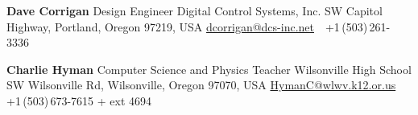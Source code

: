 \documentclass[letterpaper,MMMyyyy,nonstop]{simpleresumecv}
\newcommand{\CVNote}{}
\begin{document}
\begin{body}
\BigGap
\BulletItem
\textbf{Dave Corrigan}
\newline
Design Engineer
\newline
Digital Control Systems, Inc.
 SW Capitol Highway, 
Portland, Oregon 97219, USA
\newline
\href{mailto:dcorrigan@dcs-inc.net}
{dcorrigan@dcs-inc.net}
\,\SubBulletSymbol\,
+1\,(503)\,261-3336

\BigGap
\BulletItem
\textbf{Charlie Hyman}
\newline
Computer Science and Physics Teacher 
\newline
Wilsonville High School
 SW Wilsonville Rd, 
Wilsonville, Oregon 97070, USA
\newline
\href{mailto:HymanC@wlwv.k12.or.us}
{HymanC@wlwv.k12.or.us}
\,\SubBulletSymbol\,
+1\,(503)\,673-7615 + ext 4694

\fi

\end{body}


\iffalse

\UseNoteFont%
\null\hfill%
[\textit{\CVNote}]%
\hspace{2.0mm}\null

\fi
\end{document}
